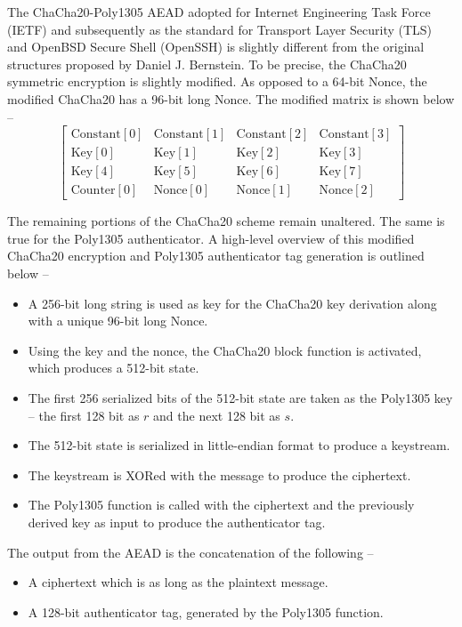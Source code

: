 \documentclass[a4paper]{cas-sc}
\begin{document}
The ChaCha20-Poly1305 AEAD adopted for Internet Engineering Task Force (IETF) \cite{rfc8439} and subsequently as the standard for Transport Layer Security (TLS) \cite{rfc7905} and OpenBSD Secure Shell (OpenSSH) \cite{miller2015chacha20} is slightly different from the original structures proposed by Daniel J. Bernstein. To be precise, the ChaCha20 symmetric encryption is slightly modified. As opposed to a 64-bit Nonce, the modified ChaCha20 has a 96-bit long Nonce. The modified matrix is shown below --
\begin{equation}\label{initialStateMod}
    \left[
        \begin{array}{cccc}
            \text{Constant}[0] & \text{Constant}[1] & \text{Constant}[2] & \text{Constant}[3] \\
            \text{Key}[0]      & \text{Key}[1]      & \text{Key}[2]      & \text{Key}[3]      \\
            \text{Key}[4]      & \text{Key}[5]      & \text{Key}[6]      & \text{Key}[7]      \\
            \text{Counter}[0]  & \text{Nonce}[0]    & \text{Nonce}[1]    & \text{Nonce}[2]
        \end{array}
        \right]
\end{equation}

The remaining portions of the ChaCha20 scheme remain unaltered. The same is true for the Poly1305 authenticator. A high-level overview of this modified ChaCha20 encryption and Poly1305 authenticator tag generation is outlined below --
\begin{itemize}
    \item A 256-bit long string is used as key for the ChaCha20 key derivation along with a unique 96-bit long Nonce.
    \item Using the key and the nonce, the ChaCha20 block function is activated, which produces a 512-bit state.
    \item The first 256 serialized bits of the 512-bit state are taken as the Poly1305 key -- the first 128 bit as $r$ and the next 128 bit as $s$.
    \item The 512-bit state is serialized in little-endian format to produce a keystream.
    \item The keystream is XORed with the message to produce the ciphertext.
    \item The Poly1305 function is called with the ciphertext and the previously derived key as input to produce the authenticator tag.
\end{itemize}
The output from the AEAD is the concatenation of the following --
\begin{itemize}
    \item A ciphertext which is as long as the plaintext message.
    \item A 128-bit authenticator tag, generated by the Poly1305 function.
\end{itemize}
\end{document}
